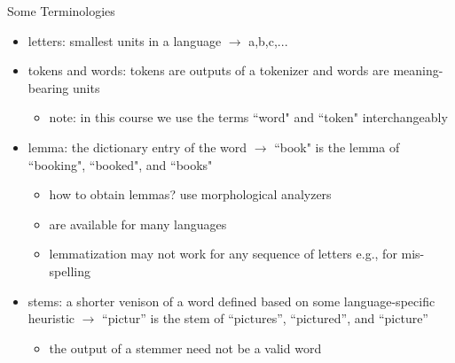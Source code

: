 \begin{frame}{Some Terminologies}
    \begin{itemize}
        \item<1-> letters: smallest units in a language $\rightarrow$ a,b,c,...
        \item<2-> tokens and words: tokens are outputs of a tokenizer and words are meaning-bearing units
        \begin{itemize}
            \item note: in this course we use the terms ``word" and ``token" interchangeably 
        \end{itemize}
        \item<3-> lemma: the dictionary entry of the word $\rightarrow$ ``book" is the lemma of ``booking", ``booked", and ``books"
            \begin{itemize}
                \item how to obtain lemmas? use morphological analyzers 
                \item are available for many languages
                \item lemmatization may not work for any sequence of letters e.g., for mis-spelling
            \end{itemize}
            
        \item<4-> stems: a shorter venison of a word defined based on some language-specific heuristic $\rightarrow$ ``pictur'' is the stem of ``pictures'', ``pictured'', and ``picture''
        \begin{itemize}
            \item the output of a stemmer need not be a valid word
        \end{itemize}
    \end{itemize}
\end{frame}
